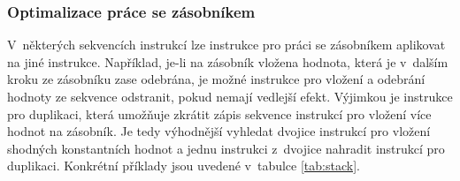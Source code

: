 \subsubsection{Optimalizace práce se zásobníkem}

V~některých sekvencích instrukcí lze instrukce pro práci se zásobníkem aplikovat na jiné instrukce. Například, je-li na zásobník vložena hodnota, která je v~dalším kroku ze zásobníku zase odebrána, je možné instrukce pro vložení a odebrání hodnoty ze sekvence odstranit, pokud nemají vedlejší efekt. Výjimkou je instrukce pro duplikaci, která umožňuje zkrátit zápis sekvence instrukcí pro vložení více hodnot na zásobník. Je tedy výhodnější vyhledat dvojice instrukcí pro vložení shodných konstantních hodnot a jednu instrukci z~dvojice nahradit instrukcí pro duplikaci. Konkrétní příklady jsou uvedené v~tabulce \ref{tab:stack}.


